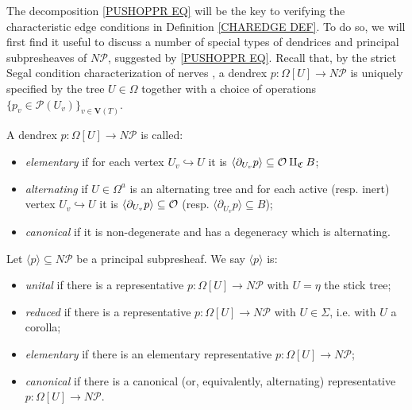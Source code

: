 \documentclass[a4paper,10pt
,draft
]{article}%
\renewcommand{\1}{\eta}%
\begin{document}
The decomposition \eqref{PUSHOPPR EQ}
will be the key to verifying the 
characteristic edge conditions in Definition \ref{CHAREDGE DEF}.
To do so, we will first find it useful to discuss a number of special types of dendrices and principal subpresheaves of $N \mathcal{P}$, suggested by \eqref{PUSHOPPR EQ}.
%
Recall that, by the strict Segal condition characterization of nerves \cite[Cor. 2.7]{CM13a},
a dendrex $p \colon \Omega[U] \to N \mathcal{P}$
is uniquely specified by the tree $U \in \Omega$ together with a choice of operations
$\{p_v \in \mathcal{P}(U_v)\}_{v \in \boldsymbol{V}(T)}$.


\begin{definition}
A dendrex $p\colon \Omega[U] \to N \mathcal{P}$ 
is called:
\begin{itemize}
\item \emph{elementary} if for each vertex $U_v \hookrightarrow U$
it is $\langle \partial_{U_v} p\rangle \subseteq \mathcal{O} \amalg_{\mathfrak{C}}B$;
\item \emph{alternating} if $U \in \Omega^a$ is an alternating tree
and for each active (resp. inert) vertex 
$U_v \hookrightarrow U$ it is
$\langle \partial_{U_v} p \rangle \subseteq \mathcal{O}$
(resp. $\langle \partial_{U_v} p \rangle \subseteq B$);
\item \emph{canonical} if it is non-degenerate and has a degeneracy which is alternating.
\end{itemize}
\end{definition}


\begin{definition}
Let $\langle p \rangle \subseteq N \mathcal{P}$ be 
a principal subpresheaf. 
We say $\langle p \rangle$ is:
\begin{itemize}
\item \emph{unital} if there is a representative
$p\colon \Omega[U] \to N \mathcal{P}$ with $U=\eta$ the stick tree;
\item \emph{reduced} if there is a representative
$p\colon \Omega[U] \to N \mathcal{P}$ with $U \in \Sigma$, i.e. with $U$ a corolla;
\item \emph{elementary} 
if there is an elementary representative
$p\colon \Omega[U] \to N \mathcal{P}$;
\item \emph{canonical} 
if there is a canonical (or, equivalently, alternating) representative
$p\colon \Omega[U] \to N \mathcal{P}$.
\end{itemize}
\end{definition}
\end{document}
